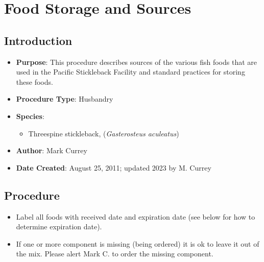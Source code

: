 \documentclass[
  letterpaper,
  DIV=11,
  numbers=noendperiod]{scrreprt}
\providecommand{\tightlist}{%
  \setlength{\itemsep}{0pt}\setlength{\parskip}{0pt}}\usepackage{longtable,booktabs,array}
\begin{document}
\hypertarget{sec-husbandry-foodstorage_sources}{%
\chapter{Food Storage and
Sources}\label{sec-husbandry-foodstorage_sources}}

\hypertarget{introduction-32}{%
\section{Introduction}\label{introduction-32}}

\begin{itemize}
\tightlist
\item
  \textbf{Purpose}: This procedure describes sources of the various fish
  foods that are used in the Pacific Stickleback Facility and standard
  practices for storing these foods.
\item
  \textbf{Procedure Type}: Husbandry
\item
  \textbf{Species}:

  \begin{itemize}
  \tightlist
  \item
    Threespine stickleback, (\emph{Gasterosteus aculeatus})
  \end{itemize}
\item
  \textbf{Author}: Mark Currey
\item
  \textbf{Date Created}: August 25, 2011; updated 2023 by M. Currey
\end{itemize}

\hypertarget{procedure-31}{%
\section{Procedure}\label{procedure-31}}

\begin{tcolorbox}[enhanced jigsaw, rightrule=.15mm, title=\textcolor{quarto-callout-warning-color}{\faExclamationTriangle}\hspace{0.5em}{NOTES}, titlerule=0mm, opacitybacktitle=0.6, toprule=.15mm, bottomrule=.15mm, opacityback=0, left=2mm, colframe=quarto-callout-warning-color-frame, breakable, coltitle=black, colback=white, colbacktitle=quarto-callout-warning-color!10!white, bottomtitle=1mm, leftrule=.75mm, toptitle=1mm, arc=.35mm]

\begin{itemize}
\tightlist
\item
  Label all foods with received date and expiration date (see below for
  how to determine expiration date).
\item
  If one or more component is missing (being ordered) it is ok to leave
  it out of the mix. Please alert Mark C. to order the missing
  component.
\end{itemize}

\end{tcolorbox}
\end{document}
